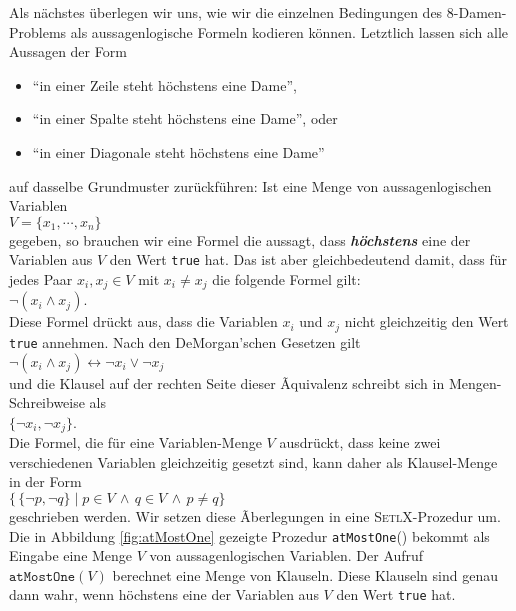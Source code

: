 Als n\"{a}chstes \"{u}berlegen wir uns, wie wir die einzelnen Bedingungen des 8-Damen-Problems 
als aussagenlogische
Formeln kodieren k\"{o}nnen.  Letztlich lassen sich alle Aussagen der Form
\begin{itemize}
\item ``in einer Zeile steht h\"{o}chstens eine Dame'', 
\item ``in einer Spalte steht h\"{o}chstens eine Dame'', oder 
\item ``in einer Diagonale steht h\"{o}chstens eine Dame'' 
\end{itemize}
auf dasselbe Grundmuster zur\"{u}ckf\"{u}hren:
Ist eine Menge von aussagenlogischen Variablen \\[0.2cm]
\hspace*{1.3cm} $V = \{ x_1, \cdots, x_n \}$ \\[0.2cm]
gegeben, so brauchen wir eine Formel die aussagt, dass \textbf{\emph{h\"{o}chstens}} eine der Variablen aus
$V$ den Wert \texttt{true} hat.  Das ist aber gleichbedeutend damit, dass f\"{u}r jedes Paar
$x_i, x_j \in V$ mit $x_i \not= x_j$ die folgende Formel gilt: \\[0.2cm]
\hspace*{1.3cm} $\neg (x_i \wedge x_j)$. \\[0.2cm]
Diese Formel dr\"{u}ckt aus, dass die Variablen $x_i$ und $x_j$ nicht gleichzeitig den Wert
\texttt{true} annehmen.  Nach den De\-Morgan'schen Gesetzen gilt
\\[0.2cm]
\hspace*{1.3cm}
$\neg (x_i \wedge x_j) \leftrightarrow \neg x_i \vee \neg x_j$
\\[0.2cm]
und die Klausel auf der rechten Seite dieser Ãquivalenz schreibt sich in Mengen-Schreibweise als
\\[0.2cm]
\hspace*{1.3cm}  $\{\neg x_i, \neg x_j \}$. \\[0.2cm]
Die Formel, die f\"{u}r eine Variablen-Menge $V$ ausdr\"{u}ckt, dass keine zwei verschiedenen
Variablen gleichzeitig gesetzt sind, kann daher als Klausel-Menge in der Form
\\[0.2cm]
\hspace*{1.3cm} $\bigl\{\, \{ \neg p, \neg q \} \;|\; p \in V \,\wedge\, q \in V
\,\wedge\, p \not= q \bigr\}$
\\[0.2cm]
geschrieben werden.
Wir setzen diese Ãberlegungen in eine \textsc{SetlX}-Prozedur um.  Die in Abbildung \ref{fig:atMostOne}
gezeigte Prozedur \texttt{atMostOne}() bekommt als Eingabe eine Menge $V$ von
aussagenlogischen Variablen.  Der Aufruf $\texttt{atMostOne}(V)$ berechnet eine Menge von
Klauseln.  Diese Klauseln sind genau dann wahr, wenn h\"{o}chstens eine der Variablen aus $V$
den Wert \texttt{true} hat.

